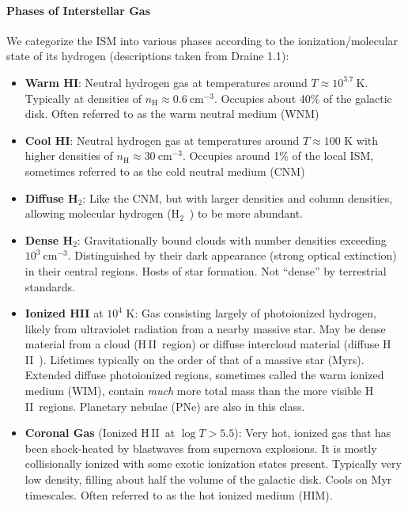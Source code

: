 \documentclass[10pt]{article}
\numberwithin{equation}{section}
\newcommand{\HII}{H\,II\ }
\newcommand{\Htwo}{H$_2$\ }
\begin{document}
\paragraph{Phases of Interstellar Gas} %
\label{ssub:phases_of_interstellar_gas}
We categorize the ISM into various phases according to the ionization/molecular
state of its hydrogen (descriptions taken from Draine 1.1):
  \begin{itemize}
    \item \textbf{Warm HI}: Neutral hydrogen gas at temperatures around $T \approx 10^{3.7}\ \mathrm{K}$. Typically at densities of $n_{\mathrm{H}}\approx 0.6\ \mathrm{cm^{-3}}$. Occupies about 40\% of the galactic disk. Often referred to as the warm neutral medium (WNM)
    \item \textbf{Cool HI}: Neutral hydrogen gas at temperatures around $T \approx 100$ K with higher densities of $n_{\mathrm{H}}\approx 30\ \mathrm{cm^{-3}}$. Occupies around 1\% of the local ISM, sometimes referred to as the cold neutral medium (CNM)
    \item \textbf{Diffuse H}$_{2}$: Like the CNM, but with larger densities and column densities, allowing molecular hydrogen (\Htwo) to be more abundant.
    \item \textbf{Dense H}$_{2}$: Gravitationally bound clouds with number densities exceeding $10^3\ \mathrm{cm^{-3}}$. Distinguished by their dark appearance (strong optical extinction) in their central regions. Hosts of star formation. Not ``dense'' by terrestrial standards.
    \item \textbf{Ionized HII} at $10^4$ K: Gas consisting largely of photoionized hydrogen, likely from ultraviolet radiation from a nearby massive star. May be dense material from a cloud (\HII region) or diffuse intercloud material (diffuse \HII). Lifetimes typically on the order of that of a massive star (Myrs). Extended diffuse photoionized regions, sometimes called the warm ionized medium (WIM), contain \emph{much} more total mass than the more visible \HII regions. Planetary nebulae (PNe) are also in this class.
    \item \textbf{Coronal Gas} (Ionized \HII at $\log T > 5.5$): Very hot, ionized gas that has been shock-heated by blastwaves from supernova explosions. It is mostly collisionally ionized with some exotic ionization states present. Typically very low density, filling about half the volume of the galactic disk. Cools on Myr timescales. Often referred to as the hot ionized medium (HIM).
  \end{itemize}
\end{document}
